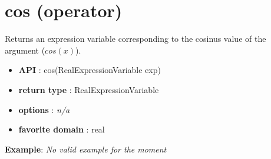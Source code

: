 \label{cos}
\hypertarget{cos}{}

\section{cos (operator)}\label{cos:cosoperator}\hypertarget{cos:cosoperator}{}
Returns an expression variable corresponding to the cosinus value of the argument (\(cos(x)\)).

\begin{itemize}
	\item \textbf{API} : cos(RealExpressionVariable exp)
	\item \textbf{return type} : RealExpressionVariable
	\item \textbf{options} : \emph{n/a}
	\item \textbf{favorite domain} : real
\end{itemize}

\textbf{Example}:
%
\emph{No valid example for the moment}
